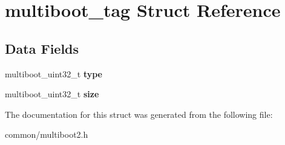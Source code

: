\hypertarget{structmultiboot__tag}{}\section{multiboot\+\_\+tag Struct Reference}
\label{structmultiboot__tag}
\subsection*{Data Fields}
\begin{DoxyCompactItemize}
\item 
multiboot\+\_\+uint32\+\_\+t {\bfseries type}\hypertarget{structmultiboot__tag_ac2a46af85d217c774d2a618291539334}{}\label{structmultiboot__tag_ac2a46af85d217c774d2a618291539334}

\item 
multiboot\+\_\+uint32\+\_\+t {\bfseries size}\hypertarget{structmultiboot__tag_a877e6f09bf575aa775a81897a54337f4}{}\label{structmultiboot__tag_a877e6f09bf575aa775a81897a54337f4}

\end{DoxyCompactItemize}


The documentation for this struct was generated from the following file\+:\begin{DoxyCompactItemize}
\item 
common/multiboot2.\+h\end{DoxyCompactItemize}
